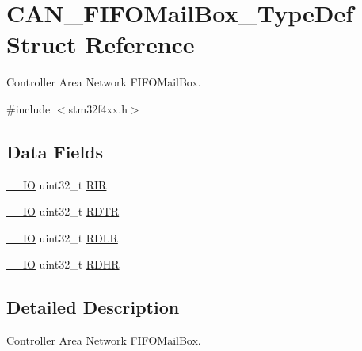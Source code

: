 \hypertarget{struct_c_a_n___f_i_f_o_mail_box___type_def}{\section{C\-A\-N\-\_\-\-F\-I\-F\-O\-Mail\-Box\-\_\-\-Type\-Def Struct Reference}
\label{struct_c_a_n___f_i_f_o_mail_box___type_def}
}


Controller Area Network F\-I\-F\-O\-Mail\-Box.  




{\ttfamily \#include $<$stm32f4xx.\-h$>$}

\subsection*{Data Fields}
\begin{DoxyCompactItemize}
\item 
\hyperlink{group___c_m_s_i_s__core__definitions_gaec43007d9998a0a0e01faede4133d6be}{\-\_\-\-\_\-\-I\-O} uint32\-\_\-t \hyperlink{struct_c_a_n___f_i_f_o_mail_box___type_def_a0acc8eb90b17bef5b9e03c7ddaacfb0b}{R\-I\-R}
\item 
\hyperlink{group___c_m_s_i_s__core__definitions_gaec43007d9998a0a0e01faede4133d6be}{\-\_\-\-\_\-\-I\-O} uint32\-\_\-t \hyperlink{struct_c_a_n___f_i_f_o_mail_box___type_def_a9563d8a88d0db403b8357331bea83a2e}{R\-D\-T\-R}
\item 
\hyperlink{group___c_m_s_i_s__core__definitions_gaec43007d9998a0a0e01faede4133d6be}{\-\_\-\-\_\-\-I\-O} uint32\-\_\-t \hyperlink{struct_c_a_n___f_i_f_o_mail_box___type_def_ae1c569688eedd49219cd505b9c22121b}{R\-D\-L\-R}
\item 
\hyperlink{group___c_m_s_i_s__core__definitions_gaec43007d9998a0a0e01faede4133d6be}{\-\_\-\-\_\-\-I\-O} uint32\-\_\-t \hyperlink{struct_c_a_n___f_i_f_o_mail_box___type_def_a7f11f42ba9d3bc5cd4a4f5ea0214608e}{R\-D\-H\-R}
\end{DoxyCompactItemize}


\subsection{Detailed Description}
Controller Area Network F\-I\-F\-O\-Mail\-Box. 

